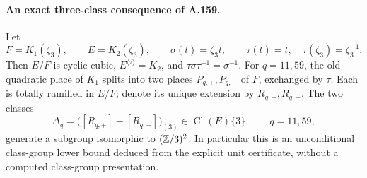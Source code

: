 \paragraph{An exact three-class consequence of A.159.}
Let
\[
 F=K_1(\zeta_3),\qquad E=K_2(\zeta_3),\qquad
 \sigma(t)=\zeta_3t,\qquad \tau(t)=t,\quad\tau(\zeta_3)=\zeta_3^{-1}.
\tag{A.159.C1}
\]
Then \(E/F\) is cyclic cubic, \(E^{\langle\tau\rangle}=K_2\), and
\(\tau\sigma\tau^{-1}=\sigma^{-1}\).
For \(q=11,59\), the old quadratic place of \(K_1\) splits into two
places \(P_{q,+},P_{q,-}\) of \(F\), exchanged by \(\tau\).
Each is totally ramified in \(E/F\); denote its unique extension by
\(R_{q,+},R_{q,-}\).  The two classes
\[
 \Delta_q=\bigl([R_{q,+}]-[R_{q,-}]\bigr)_{(3)}
                 \in\operatorname{Cl}(E)\{3\},\qquad q=11,59,
\tag{A.159.C2}
\]
generate a subgroup isomorphic to \((\mathbb Z/3)^2\).
In particular this is an unconditional class-group lower bound deduced
from the explicit unit certificate, without a computed class-group
presentation.

